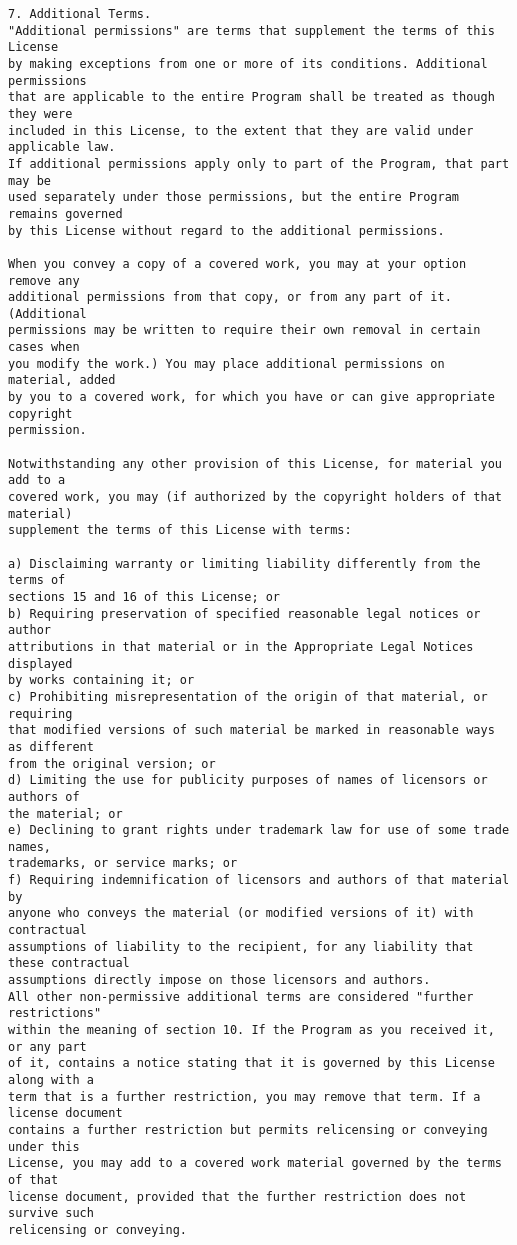 \begin{verbatim}
7. Additional Terms.
"Additional permissions" are terms that supplement the terms of this License
by making exceptions from one or more of its conditions. Additional permissions
that are applicable to the entire Program shall be treated as though they were
included in this License, to the extent that they are valid under applicable law.
If additional permissions apply only to part of the Program, that part may be
used separately under those permissions, but the entire Program remains governed
by this License without regard to the additional permissions.

When you convey a copy of a covered work, you may at your option remove any
additional permissions from that copy, or from any part of it. (Additional
permissions may be written to require their own removal in certain cases when
you modify the work.) You may place additional permissions on material, added
by you to a covered work, for which you have or can give appropriate copyright
permission.

Notwithstanding any other provision of this License, for material you add to a
covered work, you may (if authorized by the copyright holders of that material)
supplement the terms of this License with terms:

a) Disclaiming warranty or limiting liability differently from the terms of
sections 15 and 16 of this License; or
b) Requiring preservation of specified reasonable legal notices or author
attributions in that material or in the Appropriate Legal Notices displayed
by works containing it; or
c) Prohibiting misrepresentation of the origin of that material, or requiring
that modified versions of such material be marked in reasonable ways as different
from the original version; or
d) Limiting the use for publicity purposes of names of licensors or authors of
the material; or
e) Declining to grant rights under trademark law for use of some trade names,
trademarks, or service marks; or
f) Requiring indemnification of licensors and authors of that material by
anyone who conveys the material (or modified versions of it) with contractual
assumptions of liability to the recipient, for any liability that these contractual
assumptions directly impose on those licensors and authors.
All other non-permissive additional terms are considered "further restrictions"
within the meaning of section 10. If the Program as you received it, or any part
of it, contains a notice stating that it is governed by this License along with a
term that is a further restriction, you may remove that term. If a license document
contains a further restriction but permits relicensing or conveying under this
License, you may add to a covered work material governed by the terms of that
license document, provided that the further restriction does not survive such
relicensing or conveying.


\end{verbatim}
